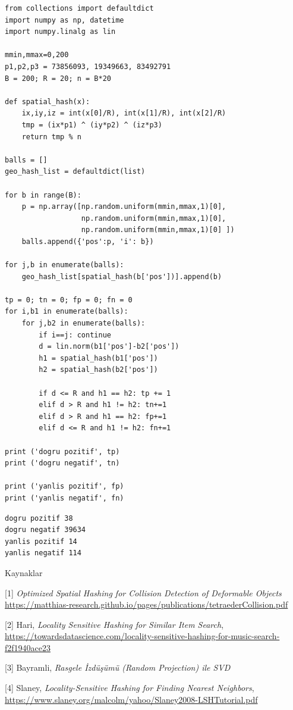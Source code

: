 \documentclass[12pt,fleqn]{article}\usepackage{../../common}
\begin{document}
\begin{verbatim}
from collections import defaultdict 
import numpy as np, datetime
import numpy.linalg as lin

mmin,mmax=0,200
p1,p2,p3 = 73856093, 19349663, 83492791
B = 200; R = 20; n = B*20

def spatial_hash(x):
    ix,iy,iz = int(x[0]/R), int(x[1]/R), int(x[2]/R)
    tmp = (ix*p1) ^ (iy*p2) ^ (iz*p3)
    return tmp % n
    
balls = []
geo_hash_list = defaultdict(list)

for b in range(B):
    p = np.array([np.random.uniform(mmin,mmax,1)[0],
                  np.random.uniform(mmin,mmax,1)[0],
                  np.random.uniform(mmin,mmax,1)[0] ])
    balls.append({'pos':p, 'i': b})

for j,b in enumerate(balls):
    geo_hash_list[spatial_hash(b['pos'])].append(b)

tp = 0; tn = 0; fp = 0; fn = 0
for i,b1 in enumerate(balls):
    for j,b2 in enumerate(balls):
        if i==j: continue
        d = lin.norm(b1['pos']-b2['pos'])
        h1 = spatial_hash(b1['pos'])
        h2 = spatial_hash(b2['pos'])
        
        if d <= R and h1 == h2: tp += 1        
        elif d > R and h1 != h2: tn+=1
        elif d > R and h1 == h2: fp+=1
        elif d <= R and h1 != h2: fn+=1

print ('dogru pozitif', tp)
print ('dogru negatif', tn)

print ('yanlis pozitif', fp)
print ('yanlis negatif', fn)
\end{verbatim}

\begin{verbatim}
dogru pozitif 38
dogru negatif 39634
yanlis pozitif 14
yanlis negatif 114
\end{verbatim}

Kaynaklar

[1] {\em Optimized Spatial Hashing for Collision Detection of Deformable Objects}
    \url{https://matthias-research.github.io/pages/publications/tetraederCollision.pdf}

[2] Hari, {\em Locality Sensitive Hashing for Similar Item Search},
    \url{https://towardsdatascience.com/locality-sensitive-hashing-for-music-search-f2f1940ace23}

[3] Bayramli, {\em Rasgele İzdüşümü (Random Projection) ile SVD}

[4] Slaney, {\em Locality-Sensitive Hashing for Finding Nearest Neighbors},
    \url{https://www.slaney.org/malcolm/yahoo/Slaney2008-LSHTutorial.pdf}
    
\end{document}
